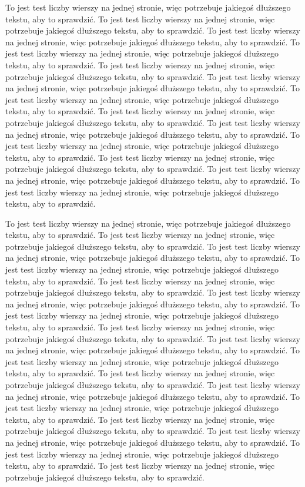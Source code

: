 To jest test liczby wierszy na jednej stronie, więc potrzebuje jakiegoś dłuższego tekstu, aby to sprawdzić.
To jest test liczby wierszy na jednej stronie, więc potrzebuje jakiegoś dłuższego tekstu, aby to sprawdzić.
To jest test liczby wierszy na jednej stronie, więc potrzebuje jakiegoś dłuższego tekstu, aby to sprawdzić.
To jest test liczby wierszy na jednej stronie, więc potrzebuje jakiegoś dłuższego tekstu, aby to sprawdzić.
To jest test liczby wierszy na jednej stronie, więc potrzebuje jakiegoś dłuższego tekstu, aby to sprawdzić.
To jest test liczby wierszy na jednej stronie, więc potrzebuje jakiegoś dłuższego tekstu, aby to sprawdzić.
To jest test liczby wierszy na jednej stronie, więc potrzebuje jakiegoś dłuższego tekstu, aby to sprawdzić.
To jest test liczby wierszy na jednej stronie, więc potrzebuje jakiegoś dłuższego tekstu, aby to sprawdzić.
To jest test liczby wierszy na jednej stronie, więc potrzebuje jakiegoś dłuższego tekstu, aby to sprawdzić.
To jest test liczby wierszy na jednej stronie, więc potrzebuje jakiegoś dłuższego tekstu, aby to sprawdzić.
To jest test liczby wierszy na jednej stronie, więc potrzebuje jakiegoś dłuższego tekstu, aby to sprawdzić.
To jest test liczby wierszy na jednej stronie, więc potrzebuje jakiegoś dłuższego tekstu, aby to sprawdzić.
To jest test liczby wierszy na jednej stronie, więc potrzebuje jakiegoś dłuższego tekstu, aby to sprawdzić.

To jest test liczby wierszy na jednej stronie, więc potrzebuje jakiegoś dłuższego tekstu, aby to sprawdzić.
To jest test liczby wierszy na jednej stronie, więc potrzebuje jakiegoś dłuższego tekstu, aby to sprawdzić.
To jest test liczby wierszy na jednej stronie, więc potrzebuje jakiegoś dłuższego tekstu, aby to sprawdzić.
To jest test liczby wierszy na jednej stronie, więc potrzebuje jakiegoś dłuższego tekstu, aby to sprawdzić.
To jest test liczby wierszy na jednej stronie, więc potrzebuje jakiegoś dłuższego tekstu, aby to sprawdzić.
To jest test liczby wierszy na jednej stronie, więc potrzebuje jakiegoś dłuższego tekstu, aby to sprawdzić.
To jest test liczby wierszy na jednej stronie, więc potrzebuje jakiegoś dłuższego tekstu, aby to sprawdzić.
To jest test liczby wierszy na jednej stronie, więc potrzebuje jakiegoś dłuższego tekstu, aby to sprawdzić.
To jest test liczby wierszy na jednej stronie, więc potrzebuje jakiegoś dłuższego tekstu, aby to sprawdzić.
To jest test liczby wierszy na jednej stronie, więc potrzebuje jakiegoś dłuższego tekstu, aby to sprawdzić.
To jest test liczby wierszy na jednej stronie, więc potrzebuje jakiegoś dłuższego tekstu, aby to sprawdzić.
To jest test liczby wierszy na jednej stronie, więc potrzebuje jakiegoś dłuższego tekstu, aby to sprawdzić.
To jest test liczby wierszy na jednej stronie, więc potrzebuje jakiegoś dłuższego tekstu, aby to sprawdzić.
To jest test liczby wierszy na jednej stronie, więc potrzebuje jakiegoś dłuższego tekstu, aby to sprawdzić.
To jest test liczby wierszy na jednej stronie, więc potrzebuje jakiegoś dłuższego tekstu, aby to sprawdzić.
To jest test liczby wierszy na jednej stronie, więc potrzebuje jakiegoś dłuższego tekstu, aby to sprawdzić.
To jest test liczby wierszy na jednej stronie, więc potrzebuje jakiegoś dłuższego tekstu, aby to sprawdzić.

